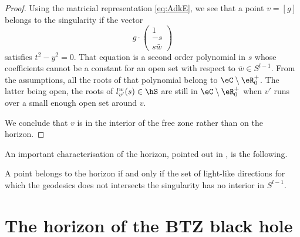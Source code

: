 	\begin{proof}
		Using the matricial representation \eqref{eq:AdkE}, we see that a point $v=[g]$ belongs to the singularity if the vector
		\begin{equation}
			g\cdot \begin{pmatrix}
				1  \\
				-s \\
				s\bar w
			\end{pmatrix}
		\end{equation}
		satisfies $t^2-y^2=0$. That equation is a second order polynomial in $s$ whose coefficients cannot be a constant for an open set with respect to $\bar w\in S^{l-1}$. From the assumptions, all the roots of that polynomial belong to $\eC\setminus\eR^+_0$. The latter being open, the roots of $l_{v'}^w(s)\in\hS$ are still in $\eC\setminus\eR^+_0$ when $v'$ runs over a small enough open set around $v$.

		We conclude that $v$ is in the interior of the free zone rather than on the horizon.
	\end{proof}

	An important characterisation of the horizon, pointed out in \cite{Keio}, is the following.
	\begin{theorem}		\label{ThoHorIntDansS}
		A point belongs to the horizon if and only if the set of light-like directions for which the geodesics does not intersects the singularity has no interior in $S^{l-1}$.
	\end{theorem}


	\section{The horizon of the BTZ black hole}
	\label{SecNewWithMatrices}

